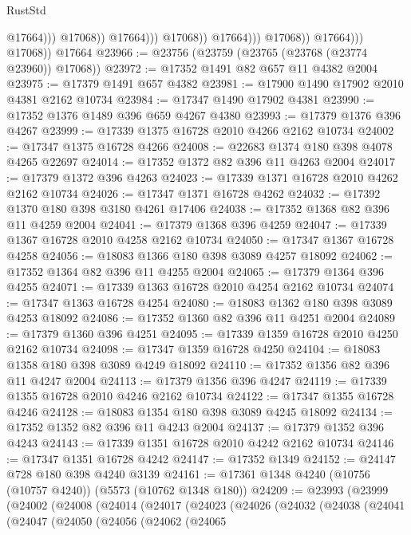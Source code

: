 \begin{lexlean}{RustStd}
\begin{coremodule}
                                            @17664)))
                                      @17068))
                                  @17664)))
                            @17068))
                        @17664)))
                  @17068))
              @17664)))
        @17068))
    @17664
@23966 := @23756 (@23759 (@23765 (@23768 (@23774 @23960)) @17068))
@23972 := @17352 @1491 @82 @657 @11 @4382 @2004
@23975 := @17379 @1491 @657 @4382
@23981 := @17900 @1490 @17902 @2010 @4381 @2162 @10734
@23984 := @17347 @1490 @17902 @4381
@23990 := @17352 @1376 @1489 @396 @659 @4267 @4380
@23993 := @17379 @1376 @396 @4267
@23999 := @17339 @1375 @16728 @2010 @4266 @2162 @10734
@24002 := @17347 @1375 @16728 @4266
@24008 := @22683 @1374 @180 @398 @4078 @4265 @22697
@24014 := @17352 @1372 @82 @396 @11 @4263 @2004
@24017 := @17379 @1372 @396 @4263
@24023 := @17339 @1371 @16728 @2010 @4262 @2162 @10734
@24026 := @17347 @1371 @16728 @4262
@24032 := @17392 @1370 @180 @398 @3180 @4261 @17406
@24038 := @17352 @1368 @82 @396 @11 @4259 @2004
@24041 := @17379 @1368 @396 @4259
@24047 := @17339 @1367 @16728 @2010 @4258 @2162 @10734
@24050 := @17347 @1367 @16728 @4258
@24056 := @18083 @1366 @180 @398 @3089 @4257 @18092
@24062 := @17352 @1364 @82 @396 @11 @4255 @2004
@24065 := @17379 @1364 @396 @4255
@24071 := @17339 @1363 @16728 @2010 @4254 @2162 @10734
@24074 := @17347 @1363 @16728 @4254
@24080 := @18083 @1362 @180 @398 @3089 @4253 @18092
@24086 := @17352 @1360 @82 @396 @11 @4251 @2004
@24089 := @17379 @1360 @396 @4251
@24095 := @17339 @1359 @16728 @2010 @4250 @2162 @10734
@24098 := @17347 @1359 @16728 @4250
@24104 := @18083 @1358 @180 @398 @3089 @4249 @18092
@24110 := @17352 @1356 @82 @396 @11 @4247 @2004
@24113 := @17379 @1356 @396 @4247
@24119 := @17339 @1355 @16728 @2010 @4246 @2162 @10734
@24122 := @17347 @1355 @16728 @4246
@24128 := @18083 @1354 @180 @398 @3089 @4245 @18092
@24134 := @17352 @1352 @82 @396 @11 @4243 @2004
@24137 := @17379 @1352 @396 @4243
@24143 := @17339 @1351 @16728 @2010 @4242 @2162 @10734
@24146 := @17347 @1351 @16728 @4242
@24147 := @17352 @1349
@24152 := @24147 @728 @180 @398 @4240 @3139
@24161 := @17361 @1348 @4240 (@10756 (@10757 @4240)) (@5573 (@10762 @1348 @180))
@24209 := @23993
    (@23999
      (@24002
        (@24008
          (@24014
            (@24017
              (@24023
                (@24026
                  (@24032
                    (@24038
                      (@24041
                        (@24047
                          (@24050
                            (@24056
                              (@24062
                                (@24065

\end{coremodule}
\end{lexlean}
